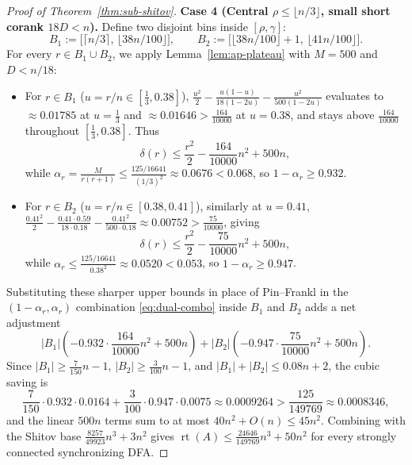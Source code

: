 \documentclass[11pt]{article}
\theoremstyle{definition}
\theoremstyle{remark}
\newcommand{\rt}{\operatorname{rt}}
\begin{document}
\begin{proof}[Proof of Theorem~\ref{thm:sub-shitov}]
\smallskip
\noindent\textbf{Case 4 (Central $\rho \le \lfloor n/3 \rfloor$, small short corank $18 D < n$).}
Define two disjoint bins inside $[\rho, \gamma]$:
\[
  B_1 := \bigl[\lceil n / 3 \rceil,\, \lfloor 38 n / 100 \rfloor\bigr], \qquad
  B_2 := \bigl[\lfloor 38 n / 100 \rfloor + 1,\, \lfloor 41 n / 100 \rfloor\bigr].
\]
For every $r \in B_1 \cup B_2$, we apply Lemma~\ref{lem:ap-plateau} with $M = 500$ and $D < n / 18$:
\begin{itemize}[leftmargin=2em]
  \item For $r \in B_1$ ($u = r / n \in [\frac{1}{3}, 0.38]$), $\frac{u^2}{2} - \frac{u(1-u)}{18(1-2u)} - \frac{u^2}{500(1-2u)}$ evaluates to $\approx 0.01785$ at $u = \frac{1}{3}$ and $\approx 0.01646 > \frac{164}{10000}$ at $u = 0.38$, and stays above $\frac{164}{10000}$ throughout $[\frac{1}{3}, 0.38]$. Thus
  \[
    \delta(r) \le \frac{r^2}{2} - \frac{164}{10000} n^2 + 500 n,
  \]
  while $\alpha_r = \frac{M}{r(r+1)} \le \frac{125/16641}{(1/3)^2} \approx 0.0676 < 0.068$, so $1 - \alpha_r \ge 0.932$.
  \item For $r \in B_2$ ($u = r / n \in [0.38, 0.41]$), similarly at $u = 0.41$, $\frac{0.41^2}{2} - \frac{0.41 \cdot 0.59}{18 \cdot 0.18} - \frac{0.41^2}{500 \cdot 0.18} \approx 0.00752 > \frac{75}{10000}$, giving
  \[
    \delta(r) \le \frac{r^2}{2} - \frac{75}{10000} n^2 + 500 n,
  \]
  while $\alpha_r \le \frac{125/16641}{0.38^2} \approx 0.0520 < 0.053$, so $1 - \alpha_r \ge 0.947$.
\end{itemize}
Substituting these sharper upper bounds in place of Pin--Frankl in the $(1 - \alpha_r, \alpha_r)$ combination \eqref{eq:dual-combo} inside $B_1$ and $B_2$ adds a net adjustment
\[
  |B_1|\left(-0.932 \cdot \frac{164}{10000} n^2 + 500 n\right)
  + |B_2|\left(-0.947 \cdot \frac{75}{10000} n^2 + 500 n\right).
\]
Since $|B_1| \ge \frac{7}{150} n - 1$, $|B_2| \ge \frac{3}{100} n - 1$, and $|B_1| + |B_2| \le 0.08 n + 2$, the cubic saving is
\[
  \frac{7}{150} \cdot 0.932 \cdot 0.0164 + \frac{3}{100} \cdot 0.947 \cdot 0.0075
  \approx 0.0009264 > \frac{125}{149769} \approx 0.0008346,
\]
and the linear $500 n$ terms sum to at most $40 n^2 + O(n) \le 45 n^2$. Combining with the Shitov base $\frac{8257}{49923} n^3 + 3 n^2$ gives $\rt(A) \le \frac{24646}{149769} n^3 + 50 n^2$ for every strongly connected synchronizing DFA.


\end{proof}
\end{document}
